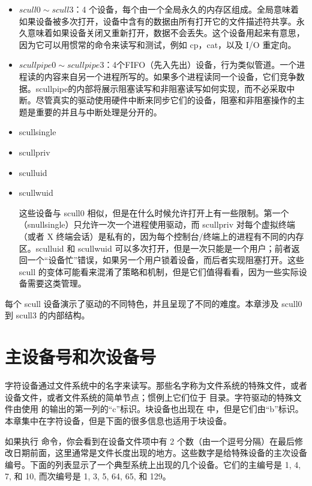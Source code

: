 \documentclass[lang=cn,newtx,10pt,scheme=chinese]{elegantbook}
\begin{document}
\begin{itemize}
    \item $scull0 \sim scull3$：4 个设备，每个由一个全局永久的内存区组成。全局意味着如果设备被多次打开，设备中含有的数据由所有打开它的文件描述符共享。永久意味着如果设备关闭又重新打开，数据不会丢失。这个设备用起来有意思，因为它可以用惯常的命令来读写和测试，例如 cp，cat，以及 I/O 重定向。
    \item $scullpipe0 \sim scullpipe3$：4个FIFO（先入先出）设备，行为类似管道。一个进程读的内容来自另一个进程所写的。如果多个进程读同一个设备，它们竞争数据。scullpipe的内部将展示阻塞读写和非阻塞读写如何实现，而不必采取中断。尽管真实的驱动使用硬件中断来同步它们的设备，阻塞和非阻塞操作的主题是重要的并且与中断处理是分开的。
    \item scullsingle
    \item scullpriv
    \item sculluid
    \item scullwuid
    
这些设备与 scull0 相似，但是在什么时候允许打开上有一些限制。第一个（snullsingle）只允许一次一个进程使用驱动，而 scullpriv 对每个虚拟终端（或者 X 终端会话）是私有的，因为每个控制台/终端上的进程有不同的内存区。sculluid 和 scullwuid 可以多次打开，但是一次只能是一个用户；前者返回一个``设备忙''错误，如果另一个用户锁着设备，而后者实现阻塞打开。这些 scull 的变体可能看来混淆了策略和机制，但是它们值得看看，因为一些实际设备需要这类管理。
\end{itemize}

每个 scull 设备演示了驱动的不同特色，并且呈现了不同的难度。本章涉及 scull0 到 scull3 的内部结构。

\section{主设备号和次设备号}

字符设备通过文件系统中的名字来读写。那些名字称为文件系统的特殊文件，或者设备文件，或者文件系统的简单节点；惯例上它们位于  目录。字符驱动的特殊文件由使用  的输出的第一列的``c''标识。块设备也出现在  中，但是它们由``b''标识。本章集中在字符设备，但是下面的很多信息也适用于块设备。

如果执行  命令，你会看到在设备文件项中有 2 个数（由一个逗号分隔）在最后修改日期前面，这里通常是文件长度出现的地方。这些数字是给特殊设备的主次设备编号。下面的列表显示了一个典型系统上出现的几个设备。它们的主编号是 1, 4, 7, 和 10, 而次编号是 1, 3, 5, 64, 65, 和 129。
\end{document}
